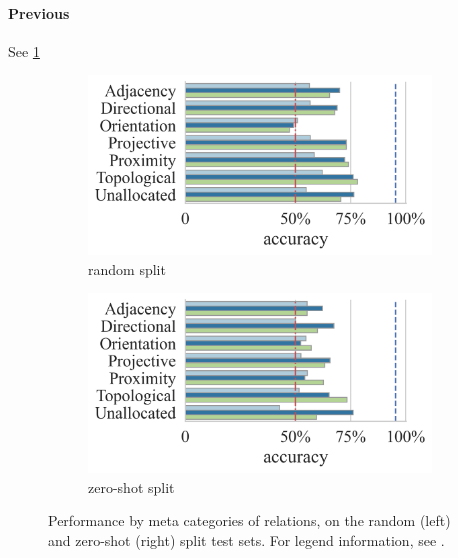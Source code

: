 \paragraph{Previous}

See \cref{fig:performance_by_meta_cat_base}

\begin{figure}
    \centering
\begin{subfigure}[b]{0.49\linewidth}
    \centering
    \includegraphics[width=\linewidth]{images/visual-spatial-reasoning/performance_by_meta_cat_random_split_v2.png}
    \caption{random split}
\end{subfigure}
\begin{subfigure}[b]{0.49\linewidth}
    \centering
    \includegraphics[width=\linewidth]{images/visual-spatial-reasoning/performance_by_meta_cat_zeroshot_split_v2.png}
    \caption{zero-shot split}
\end{subfigure}
\caption{Performance by meta categories of relations, on the random (left) and zero-shot (right) split test sets. For legend information, see .}
    \label{fig:performance_by_meta_cat_base}
\end{figure}

